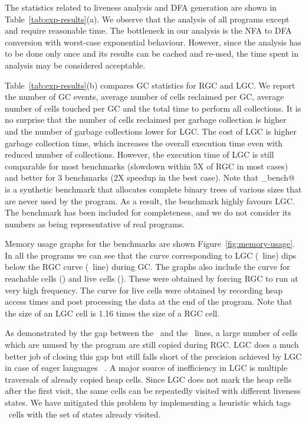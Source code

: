 \documentclass[9pt,preprint,nonatbib]{sigplanconf}
\begin{document}
The statistics  related to  liveness analysis  and DFA  generation are
shown in Table~\ref{tab:exp-results}(a). We  observe that the analysis
of  all  programs  except \verb@treejoin@  and  \verb@sudoku@  require
reasonable time.   The bottleneck in  our analysis  is the NFA  to DFA
conversion with  worst-case exponential behaviour. However,  since the
analysis has  to be  done only  once and its  results can be cached and
re-used, the time spent in analysis may be considered acceptable.


Table~\ref{tab:exp-results}(b) compares  GC statistics
for RGC and  LGC.  We report the number of  GC events,
average  number of  cells  reclaimed per  GC,  average
number of cells  touched per GC and the  total time to
perform all collections.   It is no surprise that the  number of cells
reclaimed per garbage  collection is higher and the  number of garbage
collections  lower  for  LGC.   The  cost of  LGC  is  higher  garbage
collection time, which increases the  overall execution time even with
reduced number of  collections.  However, the execution time  of LGC is
still comparable for most benchmarks (slowdown within 5X of
RGC in most cases) and better  for 3 benchmarks (2X speedup in the
best case).  Note that  \verb@gc_bench@~\cite{gc_bench} is a synthetic
benchmark that allocates complete binary
trees  of various  sizes that  are  never used  by the  program. As  a
result,  the benchmark  highly favours  LGC.  The  benchmark has  been
included  for  completeness,  and  we  do  not  consider  its  numbers
as being representative of real programs.

Memory    usage    graphs    for     the    benchmarks    are    shown
Figure~\ref{fig:memory-usage}.  In  all the  programs we can  see that
the curve  corresponding to  LGC (\LGCLine\ line)  dips below  the RGC
curve (\RGCLine\ line)  during GC.  The graphs also  include the curve
for reachable cells (\ReachLine) and live cells (\UseLine). These were
obtained by forcing  RGC to run at very high  frequency. The curve for
live  cells were  obtained by  recording  heap access  times and  post
processing the data at  the end of the program. Note  that the size of
an LGC cell is 1.16 times the size of a RGC cell.


As  demonstrated by  the gap  between the  \RGCLine\ and  the \UseLine\
lines, a  large number of  cells which are  unused by the  program are
still copied  during RGC. LGC does  a much better job  of closing this
gap but still falls short of the  precision achieved by LGC in case of
eager languages ~\cite{asati14lgc}.  A major source of inefficiency in
LGC is  multiple traversals  of already copied  heap cells.  Since LGC
does not mark the heap cells after the first visit, the same cells can
be  repeatedly  visited  with   different  liveness  states.  We  have
mitigated  this  problem  by   implementing  a  heuristic  which  tags
\CONS\ cells with the set of states already visited.
\end{document}
